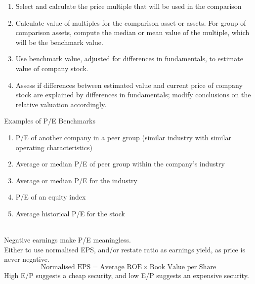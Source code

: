 \begin{method} 
\begin{enumerate}[label=\roman*.]
\setlength{\itemsep}{0pt}
\item Select and calculate the price multiple that will be used in the comparison
\item Calculate value of multiples for the comparison asset or assets. For group of comparison assets, compute the median or mean value of the multiple, which will be the benchmark value.
\item Use benchmark value, adjusted for differences in fundamentals, to estimate value of company stock.
\item Assess if differences between estimated value and current price of company stock are explained by differences in fundamentals; modify conclusions on the relative valuation accordingly.
\end{enumerate}
\end{method}

\begin{remark} Examples of P/E Benchmarks
\begin{enumerate}[label=\roman*.]
\setlength{\itemsep}{0pt}
\item P/E of another company in a peer group (similar industry with similar operating characteristics)
\item Average or median P/E of peer group within the company's industry
\item Average or median P/E for the industry
\item P/E of an equity index
\item Average historical P/E for the stock
\end{enumerate}
\end{remark}

\begin{remark} \\
Negative earnings make P/E meaningless.\\
Either to use normalised EPS, and/or restate ratio as earnings yield, as price is never negative.
\begin{equation}
\text{Normalised EPS} = \text{Average ROE} \times \text{Book Value per Share} \nonumber
\end{equation}
High E/P suggests a cheap security, and low E/P suggests an expensive security.
\end{remark}

